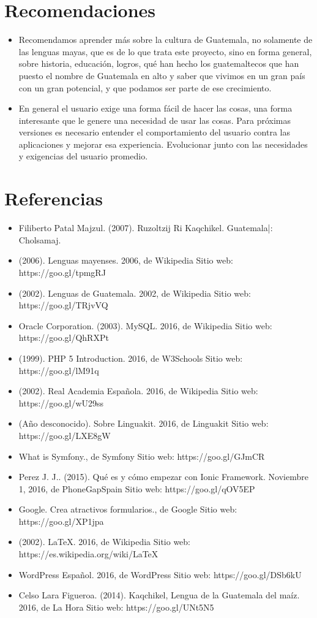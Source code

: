 \documentclass[a4paper,openright,11pt]{article}
\begin{document}
\section{Recomendaciones}
\begin{itemize}
	\item Recomendamos aprender más sobre la cultura de Guatemala, no solamente de las lenguas mayas, que es de lo que trata este proyecto, sino en forma general, sobre historia, educación, logros, qué han hecho los guatemaltecos que han puesto el nombre de Guatemala en alto y saber que vivimos en un gran país con un gran potencial, y que podamos ser parte de ese crecimiento.
	\item En general el usuario exige una forma fácil de hacer las cosas, una forma interesante que le genere una necesidad de usar las cosas. Para próximas versiones es necesario entender el comportamiento del usuario contra las aplicaciones y mejorar esa experiencia. Evolucionar junto con las necesidades y exigencias del usuario promedio.
\end{itemize}
\newpage

\section{Referencias}
\begin{itemize}
	\item Filiberto Patal Majzul. (2007). Ruzoltzij Ri Kaqchikel. Guatemala|: Cholsamaj.
	\item (2006). Lenguas mayenses. 2006, de Wikipedia Sitio web: https://goo.gl/tpmgRJ
	\item (2002). Lenguas de Guatemala. 2002, de Wikipedia Sitio web: https://goo.gl/TRjvVQ
	\item Oracle Corporation. (2003). MySQL. 2016, de Wikipedia Sitio web: https://goo.gl/QhRXPt
	\item (1999). PHP 5 Introduction. 2016, de W3Schools Sitio web: https://goo.gl/lM91q
	\item (2002). Real Academia Española. 2016, de Wikipedia Sitio web: https://goo.gl/wU29ss
	\item (Año desconocido). Sobre Linguakit. 2016, de Linguakit Sitio web: https://goo.gl/LXE8gW
	\item What is Symfony., de Symfony Sitio web: https://goo.gl/GJmCR
	\item Perez J. J.. (2015). Qué es y cómo empezar con Ionic Framework. Noviembre 1, 2016, de PhoneGapSpain Sitio web: https://goo.gl/qOV5EP
	\item Google. Crea atractivos formularios., de Google Sitio web: https://goo.gl/XP1jpa
	\item (2002). LaTeX. 2016, de Wikipedia Sitio web: https://es.wikipedia.org/wiki/LaTeX
	\item WordPress Español. 2016, de WordPress Sitio web: https://goo.gl/DSb6kU
	\item Celso Lara Figueroa. (2014). Kaqchikel, Lengua de la Guatemala del maíz. 2016, de La Hora Sitio web: https://goo.gl/UNt5N5
\end{itemize}
\newpage
\end{document}
